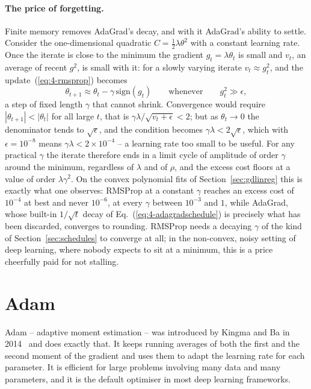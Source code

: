 \paragraph{The price of forgetting.}
Finite memory removes AdaGrad's decay, and with it AdaGrad's ability to
settle.  Consider the one-dimensional quadratic $C=\frac12\lambda\theta^{2}$
with a constant learning rate.  Once the iterate is close to the minimum the
gradient $g_t=\lambda\theta_t$ is small and $v_t$, an average of recent
$g^{2}$, is small with it: for a slowly varying iterate $v_t\approx g_t^{2}$,
and the update~(\ref{eq:4-rmsprop}) becomes
\begin{equation}
  \theta_{t+1}\approx\theta_t-\gamma\,\mathrm{sign}(g_t)
  \qquad\text{whenever}\qquad g_t^{2}\gg\epsilon ,
  \label{eq:4-rmspropsign}
\end{equation}
a step of fixed length $\gamma$ that cannot shrink.  Convergence would
require $|\theta_{t+1}|<|\theta_t|$ for all large $t$, that is
$\gamma\lambda/\sqrt{v_t+\epsilon}<2$; but as $\theta_t\to0$ the
denominator tends to $\sqrt{\epsilon}$, and the condition becomes
$\gamma\lambda<2\sqrt{\epsilon}$, which with $\epsilon=10^{-8}$ means
$\gamma\lambda<2\times10^{-4}$ -- a learning rate too small to be useful.
For any practical $\gamma$ the iterate therefore ends in a limit cycle of
amplitude of order $\gamma$ around the minimum, regardless of $\lambda$ and
of $\rho$, and the excess cost floors at a value of order $\lambda\gamma^{2}$.  On the
convex polynomial fits of Section~\ref{sec:gdlinreg} this is exactly what
one observes: RMSProp at a constant $\gamma$ reaches an excess cost of
$10^{-4}$ at best and never $10^{-6}$, at every $\gamma$ between $10^{-3}$ and $1$,
while AdaGrad, whose built-in $1/\sqrt{t}$ decay of
Eq.~(\ref{eq:4-adagradschedule}) is precisely what has been discarded,
converges to rounding.  RMSProp needs a decaying $\gamma$ of the kind of
Section~\ref{sec:schedules} to converge at all; in the non-convex, noisy
setting of deep learning, where nobody expects to sit at a minimum, this is a
price cheerfully paid for not stalling.

\section{Adam}
\label{sec:adam}

Adam -- adaptive moment estimation -- was introduced by Kingma and Ba in
2014~\cite{kingma2014} and does exactly that.  It keeps running averages of
both the first and the second moment of the gradient and uses them to adapt
the learning rate for each parameter.  It is efficient for large problems
involving many data and many parameters, and it is the default optimiser in
most deep learning frameworks.

